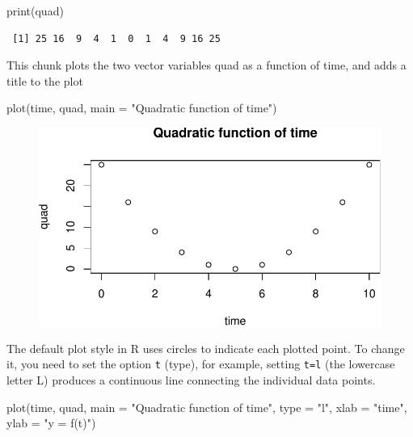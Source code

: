 \documentclass[
  letterpaper,
  DIV=11,
  numbers=noendperiod]{scrreprt}
\newenvironment{Shaded}{\begin{snugshade}}{\end{snugshade}}
\newcommand{\AttributeTok}[1]{\textcolor[rgb]{0.40,0.45,0.13}{#1}}
\newcommand{\FunctionTok}[1]{\textcolor[rgb]{0.28,0.35,0.67}{#1}}
\newcommand{\NormalTok}[1]{\textcolor[rgb]{0.00,0.23,0.31}{#1}}
\newcommand{\StringTok}[1]{\textcolor[rgb]{0.13,0.47,0.30}{#1}}
\begin{document}
\begin{Shaded}
\begin{Highlighting}[]
\FunctionTok{print}\NormalTok{(quad)}
\end{Highlighting}
\end{Shaded}

\begin{verbatim}
 [1] 25 16  9  4  1  0  1  4  9 16 25
\end{verbatim}

This chunk plots the two vector variables quad as a function of time,
and adds a title to the plot

\begin{Shaded}
\begin{Highlighting}[]
\FunctionTok{plot}\NormalTok{(time, quad, }\AttributeTok{main =} \StringTok{"Quadratic function of time"}\NormalTok{)}
\end{Highlighting}
\end{Shaded}

\begin{figure}[H]

{\centering \includegraphics{./functions_files/figure-pdf/unnamed-chunk-22-1.pdf}

}

\end{figure}

The default plot style in R uses circles to indicate each plotted point.
To change it, you need to set the option \texttt{t} (type), for example,
setting \texttt{t=\textquotesingle{}l\textquotesingle{}} (the lowercase
letter L) produces a continuous line connecting the individual data
points.

\begin{Shaded}
\begin{Highlighting}[]
\FunctionTok{plot}\NormalTok{(time, quad, }\AttributeTok{main =} \StringTok{"Quadratic function of time"}\NormalTok{, }\AttributeTok{type =} \StringTok{"l"}\NormalTok{, }\AttributeTok{xlab =} \StringTok{"time"}\NormalTok{,}
    \AttributeTok{ylab =} \StringTok{"y = f(t)"}\NormalTok{)}
\end{Highlighting}
\end{Shaded}
\end{document}
